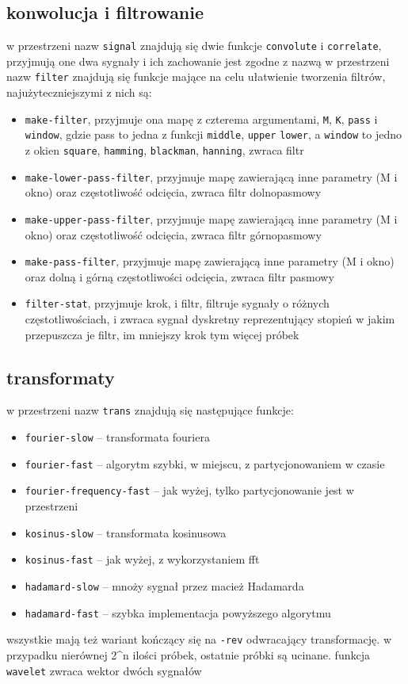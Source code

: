 \documentclass[12pt]{article}
\newcommand{\cljt}[1]{\texttt{#1}}
\begin{document}
\subsection{konwolucja i filtrowanie}
w przestrzeni nazw \cljt{signal} znajdują się dwie funkcje \cljt{convolute} i
\cljt{correlate}, przyjmują one dwa sygnały i ich zachowanie jest zgodne z nazwą
w przestrzeni nazw \cljt{filter} znajdują się funkcje mające na celu ułatwienie
tworzenia filtrów, najużyteczniejszymi z nich są:
\begin{itemize}
	\item \cljt{make-filter}, przyjmuje ona mapę z czterema argumentami, \cljt{M}, \cljt{K}, \cljt{pass}
	      i \cljt{window}, gdzie pass to jedna z funkcji \cljt{middle}, \cljt{upper}
	      \cljt{lower}, a \cljt{window} to jedno z okien \cljt{square},
	      \cljt{hamming}, \cljt{blackman}, \cljt{hanning}, zwraca filtr
	\item \cljt{make-lower-pass-filter}, przyjmuje mapę zawierającą inne parametry
	      (M i okno) oraz częstotliwość odcięcia, zwraca filtr dolnopasmowy
	\item \cljt{make-upper-pass-filter}, przyjmuje mapę zawierającą inne parametry
	      (M i okno) oraz częstotliwość odcięcia, zwraca filtr górnopasmowy
	\item \cljt{make-pass-filter}, przyjmuje mapę zawierającą inne parametry
	      (M i okno) oraz dolną i górną częstotliwości odcięcia, zwraca filtr pasmowy
	\item \cljt{filter-stat}, przyjmuje krok, i filtr, filtruje
	      sygnały o różnych częstotliwościach, i zwraca sygnał dyskretny
	      reprezentujący stopień w jakim przepuszcza je filtr, im mniejszy krok
	      tym więcej próbek
\end{itemize}
\subsection{transformaty}
w przestrzeni nazw \cljt{trans} znajdują się następujące funkcje:
\begin{itemize}
	\item \cljt{fourier-slow} -- transformata fouriera
	\item \cljt{fourier-fast} -- algorytm szybki, w miejscu, z partycjonowaniem w czasie
	\item \cljt{fourier-frequency-fast} -- jak wyżej, tylko partycjonowanie jest w przestrzeni
	\item \cljt{kosinus-slow} -- transformata kosinusowa
	\item \cljt{kosinus-fast} -- jak wyżej, z wykorzystaniem fft
	\item \cljt{hadamard-slow} -- mnoży sygnał przez macież Hadamarda
	\item \cljt{hadamard-fast} -- szybka implementacja powyższego algorytmu
\end{itemize}
wszystkie mają też wariant kończący się na \cljt{-rev} odwracający
transformację.
w przypadku nierównej 2^n ilości próbek, ostatnie próbki są ucinane.
funkcja \cljt{wavelet} zwraca wektor dwóch sygnałów
\end{document}
